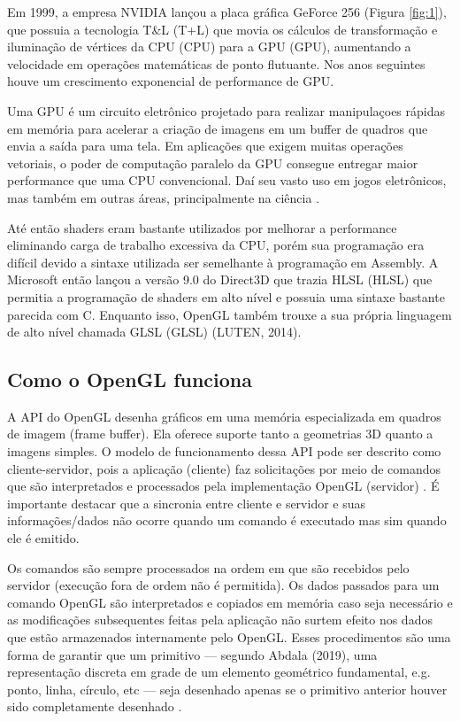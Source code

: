 Em 1999, a empresa NVIDIA lançou a placa gráfica GeForce 256 (Figura \ref{fig:1}), que possuia a tecnologia T\&L (\acrlong{T+L}) que movia os cálculos de transformação e iluminação de vértices da CPU (\acrlong{CPU}) para a \acrshort{GPU} (\acrlong{GPU}), aumentando a velocidade em operações matemáticas de ponto flutuante. Nos anos seguintes houve um crescimento exponencial de performance de \acrshort{GPU}.

Uma GPU é um circuito eletrônico projetado para realizar manipulaçoes rápidas em memória para acelerar a criação de imagens em um buffer de quadros que envia a saída para uma tela. Em aplicações que exigem muitas operações vetoriais, o poder de computação paralelo da GPU consegue entregar maior performance que uma CPU convencional. Daí seu vasto uso em jogos eletrônicos, mas também em outras áreas, principalmente na ciência \cite{shea2013gpu}.

Até então shaders eram bastante utilizados por melhorar a performance eliminando carga de trabalho excessiva da \acrshort{CPU}, porém sua programação era difícil devido a sintaxe utilizada ser semelhante à programação em Assembly. A Microsoft então lançou a versão 9.0 do Direct3D que trazia \acrlong{HLSL} (HLSL) que permitia a programação de shaders em alto nível e possuia uma sintaxe bastante parecida com C. Enquanto isso, OpenGL também trouxe a sua própria linguagem de alto nível chamada GLSL (\acrlong{GLSL}) (LUTEN, 2014)\nocite{openGLBook}. 

\subsection{Como o OpenGL funciona}
\label{sec:como-opengl-funciona}

A API do OpenGL desenha gráficos em uma memória especializada em quadros de imagem (frame buffer). Ela oferece suporte tanto a geometrias 3D quanto a imagens simples. O modelo de funcionamento dessa API pode ser descrito como cliente-servidor, pois a aplicação (cliente) faz solicitações por meio de comandos que são interpretados e processados pela implementação OpenGL (servidor) \cite{GLSLBook}. É importante destacar que a sincronia entre cliente e servidor e suas informações/dados não ocorre quando um comando é executado mas sim quando ele é emitido.

Os comandos são sempre processados na ordem em que são recebidos pelo servidor (execução fora de ordem não é permitida). Os dados passados para um comando OpenGL são interpretados e copiados em memória caso seja necessário e as modificações subsequentes feitas pela aplicação não surtem efeito nos dados que estão armazenados internamente pelo OpenGL. Esses procedimentos são uma forma de garantir que um primitivo --- segundo Abdala (2019)\nocite{abdala}, uma representação discreta em grade de um elemento geométrico fundamental, e.g. ponto, linha, círculo, etc --- seja desenhado apenas se o primitivo anterior houver sido completamente desenhado \cite{GLSLBook}.

